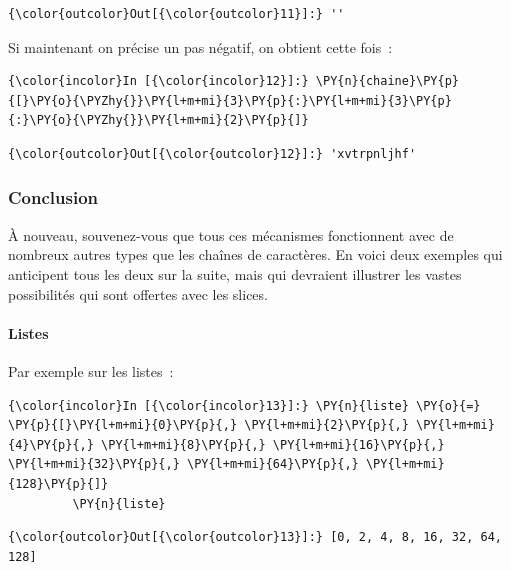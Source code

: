 \begin{Verbatim}[commandchars=\\\{\}]
{\color{outcolor}Out[{\color{outcolor}11}]:} ''
\end{Verbatim}
            
    Si maintenant on précise un pas négatif, on obtient cette fois~:

    \begin{Verbatim}[commandchars=\\\{\}]
{\color{incolor}In [{\color{incolor}12}]:} \PY{n}{chaine}\PY{p}{[}\PY{o}{\PYZhy{}}\PY{l+m+mi}{3}\PY{p}{:}\PY{l+m+mi}{3}\PY{p}{:}\PY{o}{\PYZhy{}}\PY{l+m+mi}{2}\PY{p}{]}
\end{Verbatim}


\begin{Verbatim}[commandchars=\\\{\}]
{\color{outcolor}Out[{\color{outcolor}12}]:} 'xvtrpnljhf'
\end{Verbatim}
            
    \hypertarget{conclusion}{%
\subsubsection{Conclusion}\label{conclusion}}

    À nouveau, souvenez-vous que tous ces mécanismes fonctionnent avec de
nombreux autres types que les chaînes de caractères. En voici deux
exemples qui anticipent tous les deux sur la suite, mais qui devraient
illustrer les vastes possibilités qui sont offertes avec les slices.

    \hypertarget{listes}{%
\paragraph{Listes}\label{listes}}

    Par exemple sur les listes~:

    \begin{Verbatim}[commandchars=\\\{\}]
{\color{incolor}In [{\color{incolor}13}]:} \PY{n}{liste} \PY{o}{=} \PY{p}{[}\PY{l+m+mi}{0}\PY{p}{,} \PY{l+m+mi}{2}\PY{p}{,} \PY{l+m+mi}{4}\PY{p}{,} \PY{l+m+mi}{8}\PY{p}{,} \PY{l+m+mi}{16}\PY{p}{,} \PY{l+m+mi}{32}\PY{p}{,} \PY{l+m+mi}{64}\PY{p}{,} \PY{l+m+mi}{128}\PY{p}{]}
         \PY{n}{liste}
\end{Verbatim}


\begin{Verbatim}[commandchars=\\\{\}]
{\color{outcolor}Out[{\color{outcolor}13}]:} [0, 2, 4, 8, 16, 32, 64, 128]
\end{Verbatim}
            
